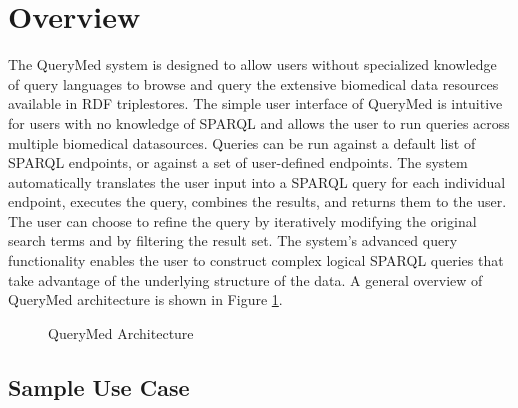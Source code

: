\documentclass{acm_proc_article-sp}
\begin{document}
\newpage

\section{Overview}

The QueryMed system is designed to allow users without specialized knowledge of query languages to browse and query the extensive biomedical data resources available in RDF triplestores. The simple user interface of QueryMed is intuitive for users with no knowledge of SPARQL and allows the user to run queries across multiple biomedical datasources.  Queries can be run against a default list of SPARQL endpoints, or against a set of user-defined endpoints. The system automatically translates the user input into a SPARQL query for each individual endpoint, executes the query, combines the results, and returns them to the user.  The user can choose to refine the query by iteratively modifying the original search terms and by filtering the result set.  The system's advanced query functionality enables the user to construct complex logical SPARQL queries that take advantage of the underlying structure of the data.  A general overview of QueryMed architecture is shown in Figure \ref{fig:arch_details}.

\begin{figure}[h]
\centering
{}
\caption{QueryMed Architecture}
\label{fig:arch_details}
\end{figure}

\newpage

\subsection{Sample Use Case}
\end{document}
